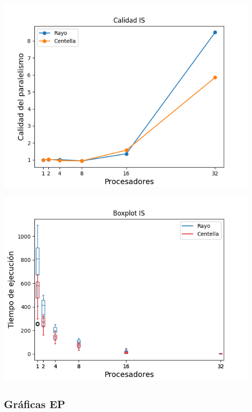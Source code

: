 \begin{center}
 \centering
 \begin{minipage}[b]{.49\textwidth}
  \includegraphics[width=1\linewidth]{plots/calidad-is.png}
 \end{minipage}
 \begin{minipage}[b]{.49\textwidth}
  \includegraphics[width=1\linewidth]{plots/boxplot-is.png}
  \label{is:tiempo}
 \end{minipage}
\end{center}

\newpage

\subsection{Gráficas EP}

